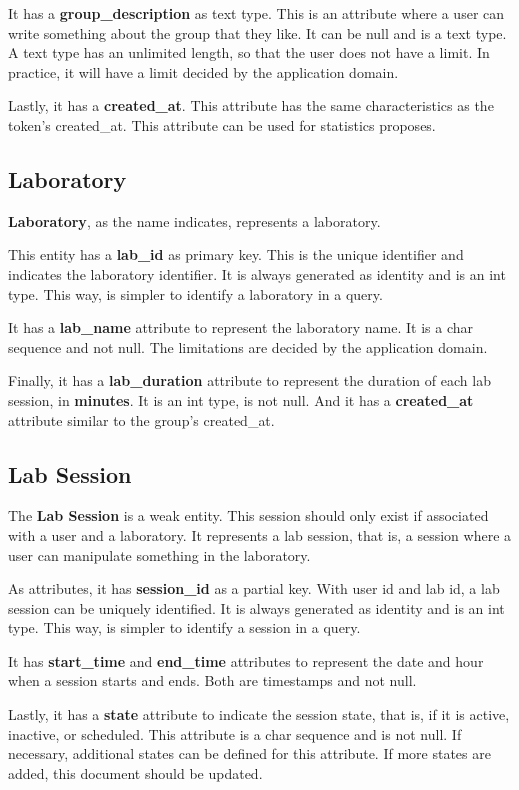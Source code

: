 \documentclass[a4paper,twoside,11pt]{article}
\begin{document}
It has a \textbf{group\_description} as text type. This is an attribute where a user can write something about the group that they like. It can be null and is a text type.
A text type has an unlimited length, so that the user does not have a limit. In practice, it will have a limit decided by the application domain.

Lastly, it has a \textbf{created\_at}. This attribute has the same characteristics as the token's created\_at. This attribute can be used for statistics proposes.

\subsection*{Laboratory}
\textbf{Laboratory}, as the name indicates, represents a laboratory. 

This entity has a \textbf{lab\_id} as primary key. This is the unique identifier and indicates the laboratory identifier. It is always generated as identity and is an int type. This way, is simpler to identify a laboratory in a query.

It has a \textbf{lab\_name} attribute to represent the laboratory name. It is a char sequence and not null. The limitations are decided by the application domain.

Finally, it has a \textbf{lab\_duration} attribute to represent the duration of each lab session, in \textbf{minutes}. It is an int type, is not null.
And it has a \textbf{created\_at} attribute similar to the group's created\_at.

\subsection*{Lab Session}
The \textbf{Lab Session} is a weak entity. This session should only exist if associated with a user and a laboratory. It represents a lab session, that is, a session where a user can manipulate something in the laboratory.

As attributes, it has \textbf{session\_id} as a partial key. With user id and lab id, a lab session can be uniquely identified. It is always generated as identity and is an int type. This way, is simpler to identify a session in a query.

It has \textbf{start\_time} and \textbf{end\_time} attributes to represent the date and hour when a session starts and ends. Both are timestamps and not null.

Lastly, it has a \textbf{state} attribute to indicate the session state, that is, if it is active, inactive, or scheduled. This attribute is a char sequence and is not null. If necessary, additional states can be defined for this attribute. If more states are added, this document should be updated.
\end{document}
